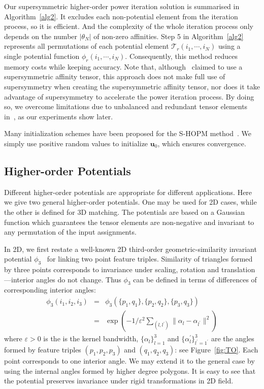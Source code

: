 Our supersymmetric higher-order power iteration solution is summarised in Algorithm~\ref{alg2}. It excludes each non-potential element from the iteration process, so it is efficient.
And the complexity of the whole iteration process only depends on the number $|\theta_N|$ of non-zero affinities. Step 5 in Algorithm~\ref{alg2} represents all permutations of each potential element $\mathcal{T}_r(i_1,\cdots,i_N)$
using a single potential function $\phi_r(i_1,\cdots,i_N)$.
Consequently, this method reduces memory costs while keeping accuracy.
Note that, although~\cite{Duchenne09} claimed to use a supersymmetric affinity tensor,
this approach does not make full use of supersymmetry when creating the supersymmetric affinity tensor,
nor does it take advantage of supersymmetry to accelerate the power iteration process.
By doing so, we overcome limitations due to unbalanced and redundant tensor elements in~\cite{Duchenne09}, as our experiments show later.

Many initialization schemes have been proposed for the S-HOPM method~\cite{Kofidis02}.
We simply use positive random values to initialize $\boldsymbol{u}_0$, which ensures   convergence.

\subsection{Higher-order Potentials}
\label{subsec:potentials}

Different higher-order potentials are appropriate for different applications.
Here we give two general higher-order potentials.
One may be used for  2D cases, while the other is defined for 3D matching.
The potentials are based on a Gaussian function
which guarantees the tensor elements are non-negative and invariant to any permutation of the input assignments.

In 2D, we first restate a well-known 2D third-order geometric-similarity invariant potential $\phi_3$~\cite{Duchenne09,Chertok10} for linking two point feature triples.
Similarity of triangles formed by three points corresponds to invariance under scaling, rotation and translation---interior angles do not change.
Thus $\phi_3$ can be defined in terms of differences of corresponding interior angles:
\begin{eqnarray}
\phi_3(i_1,i_2,i_3)&=&\phi_3(\{p_1,q_1\}, \{p_2,q_2\}, \{p_3,q_3\})\nonumber\\
&=&\exp(-1/\varepsilon^2\sum\nolimits_{(l,l^{'})}\lVert \alpha_l- \alpha_{l^{'} } \lVert^2 )
\end{eqnarray}
where $\varepsilon > 0$ is the is the kernel bandwidth,
$\{\alpha_l\}_{l=1}^3$ and $\{\alpha_l^{'}\}_{l^{'}=1^{'}}^{3}$ are the angles formed by feature triples $(p_1,p_2,p_3)$ and $(q_1,q_2,q_3)$:
see Figure~\ref{fig:TO}. Each point corresponds to one interior angle.
We may extend it to the general case by using the internal angles formed by higher degree polygons.
It is easy to see that the potential preserves invariance under rigid transformations in 2D field.

